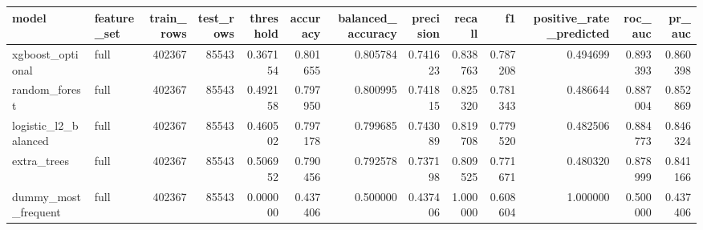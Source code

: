 \begin{tabular}{llrrrrrrrrrrr}
\toprule
model & feature_set & train_rows & test_rows & threshold & accuracy & balanced_accuracy & precision & recall & f1 & positive_rate_predicted & roc_auc & pr_auc \\
\midrule
xgboost_optional & full & 402367 & 85543 & 0.367154 & 0.801655 & 0.805784 & 0.741623 & 0.838763 & 0.787208 & 0.494699 & 0.893393 & 0.860398 \\
random_forest & full & 402367 & 85543 & 0.492158 & 0.797950 & 0.800995 & 0.741815 & 0.825320 & 0.781343 & 0.486644 & 0.887004 & 0.852869 \\
logistic_l2_balanced & full & 402367 & 85543 & 0.460502 & 0.797178 & 0.799685 & 0.743089 & 0.819708 & 0.779520 & 0.482506 & 0.884773 & 0.846324 \\
extra_trees & full & 402367 & 85543 & 0.506952 & 0.790456 & 0.792578 & 0.737198 & 0.809525 & 0.771671 & 0.480320 & 0.878999 & 0.841166 \\
dummy_most_frequent & full & 402367 & 85543 & 0.000000 & 0.437406 & 0.500000 & 0.437406 & 1.000000 & 0.608604 & 1.000000 & 0.500000 & 0.437406 \\
\bottomrule
\end{tabular}

